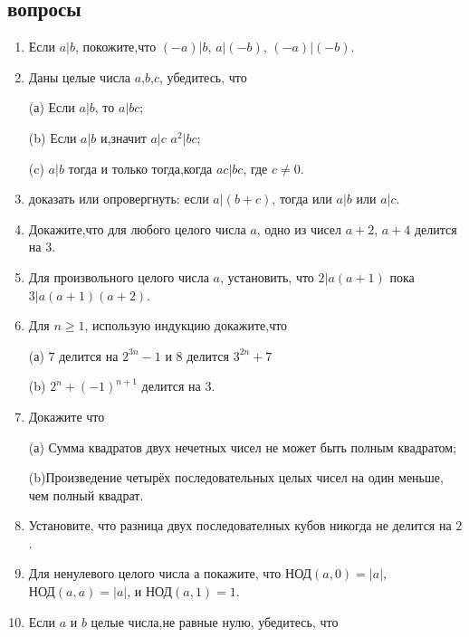 \documentclass[11pt]{article}
\begin{document}
\subsection{вопросы}
\begin{enumerate}
\item Если $a|b$, покожите,что $(-a)|b$, $a|(-b)$, $(-a)|(-b)$.
\item Даны целые числа $a$,$b$,$c$, убедитесь, что
\begin{enumerate}
	(а)  Если $a|b$, то $a|bc$;
\end{enumerate}
\begin{enumerate}
	(b) Если  $a|b$ и,значит $a|c$ $a^{2}|bc$;
\end{enumerate}
\begin{enumerate}
	(c)  $a|b$ тогда и только тогда,когда $ac|bc$, где $c \neq 0$.
\end{enumerate}

\item доказать или опровергнуть: если $a|(b+c)$, тогда или $a|b$ или $a|c$.
\item Докажите,что для любого целого числа $a$, одно из чисел $a + 2$, $a + 4$ делится на $3$.
\item Для произвольного целого числа $a$, установить, что $2|a(a+1)$ пока $3|a(a+1)(a+2)$.
\item Для $n\ge 1$, использую индукцию докажите,что
\begin{enumerate}
	(а)  $7$ делится на $2^{3n}-1$ и $8$ делится $3^{2n}+7$
\end{enumerate}
\begin{enumerate}
	(b) $2^{n}+(-1)^{n+1}$ делится на $3$.
\end{enumerate}
\item Докажите что
\begin{enumerate}
	(а)  Сумма квадратов двух нечетных чисел не может быть полным квадратом;
\end{enumerate}
\begin{enumerate}
	(b)Произведение четырёх последовательных целых чисел на один меньше, чем полный квадрат.
\end{enumerate}
\item Установите, что разница двух последователных кубов никогда не делится на $2$.
\item Для ненулевого целого числа а покажите, что $\text{НОД}(a,0)=|a|$, $\text{НОД}(a,a)=|a|$, и $\text{НОД}(a,1)=1$.
\item  Если $a$ и $b$ целые числа,не равные нулю, убедитесь, что


\end{enumerate}
\end{document}
